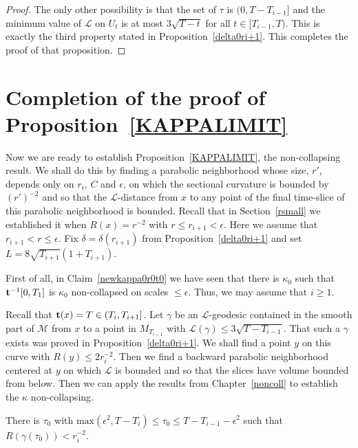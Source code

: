 \begin{proof}
The only other possibility is that the set of $\tau$ is $(0,T-T_{i-1}]$ and the
minimum value of ${\mathcal L}$ on $U_t$ is at most $3\sqrt{T-t}$ for all $t\in
[T_{i-1},T)$. This is exactly the third property stated in
Proposition~\ref{delta0ri+1}. This completes the proof of that proposition.
\end{proof}




\section{Completion of the proof of
Proposition~{\ref{KAPPALIMIT}}}

Now we are ready to establish Proposition~\ref{KAPPALIMIT}, the
non-collapsing result. We shall do this by finding a parabolic
neighborhood whose size, $r'$, depends only on $r_i$, $C$ and
$\epsilon$, on which the sectional curvature is bounded by
$(r')^{-2}$ and so that the ${\mathcal L}$-distance from $x$ to any
point of the final time-slice of this parabolic neighborhood is
bounded. Recall that in Section~\ref{rsmall} we established it when
$R(x)=r^{-2}$ with $r\le r_{i+1}<\epsilon$. Here we assume that
$r_{i+1}<r\le \epsilon$.  Fix $\delta=\delta(r_{i+1})$ from
Proposition~\ref{delta0ri+1} and set $L=8\sqrt{T_{i+1}}(1+T_{i+1})$.

First of all, in Claim~\ref{newkappa0r0t0} we have  seen that there
is $\kappa_0$ such that ${\bf t}^{-1}[0,T_1]$ is $\kappa_0$
non-collapsed on scales $\le \epsilon$. Thus, we may assume that
$i\ge 1$.

Recall that ${\bf t}(x)=T\in (T_{i},T_{i+1}]$. Let $\gamma$ be an
${\mathcal L}$-geodesic contained in the smooth part of ${\mathcal
M}$ from $x$ to a point in $ M_{T_{i-1}}$ with ${\mathcal
L}(\gamma)\le 3\sqrt{T-T_{i-1}}$. That such a $\gamma$ exists was
proved in Proposition~\ref{delta0ri+1}. We shall find a point $y$ on
this curve with  $R(y)\le 2r_i^{-2}$. Then  we find a backward
parabolic neighborhood centered at $y$ on which ${\mathcal L}$ is
bounded and so that the slices have volume bounded from below. Then
we can apply the results from Chapter~\ref{noncoll} to establish the
$\kappa$ non-collapsing.

\begin{claim}
\label{claim:existence-of-tau0-low-curvature-point}\label{tau0cl}
There is $\tau_0$  with $\mathrm{max}(\epsilon^2,T-T_i)\le \tau_0\le
T-T_{i-1}-\epsilon^2$ such that $R(\gamma(\tau_0))< r_i^{-2}$.
\end{claim}



